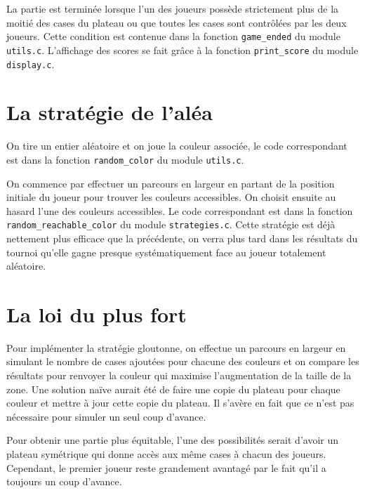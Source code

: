 \documentclass[12pt,L,fira-sans]{paper}
\begin{document}
\begin{qu}
    La partie est terminée lorsque l'un des joueurs possède strictement plus de la moitié des cases du plateau ou que toutes les cases sont contrôlées par les deux joueurs.
    Cette condition est contenue dans la fonction \verb|game_ended| du module \verb|utils.c|. L'affichage des scores se fait grâce à la fonction \verb|print_score| du module \verb|display.c|.
\end{qu}

\section{La stratégie de l'aléa}

\begin{qu}
    On tire un entier aléatoire et on joue la couleur associée, le code correspondant est dans la fonction \verb|random_color| du module \verb|utils.c|.
\end{qu}

\begin{qu}
    On commence par effectuer un parcours en largeur en partant de la position initiale du joueur pour trouver les couleurs accessibles. On choisit ensuite au hasard l'une des couleurs accessibles. Le code correspondant est dans la fonction \verb|random_reachable_color| du module \verb|strategies.c|.
    Cette stratégie est déjà nettement plus efficace que la précédente, on verra plus tard dans les résultats du tournoi qu'elle gagne presque systématiquement face au joueur totalement aléatoire.
\end{qu}

\section{La loi du plus fort}

\begin{qu}
    Pour implémenter la stratégie gloutonne, on effectue un parcours en largeur en simulant le nombre de cases ajoutées pour chacune des couleurs et on compare les résultats pour renvoyer la couleur qui maximise l'augmentation de la taille de la zone.
    Une solution naïve aurait été de faire une copie du plateau pour chaque couleur et mettre à jour cette copie du plateau. Il s'avère en fait que ce n'est pas nécessaire pour simuler un seul coup d'avance.
\end{qu}

\begin{qu}
    Pour obtenir une partie plus équitable, l'une des possibilités serait d'avoir un plateau symétrique qui donne accès aux même cases à chacun des joueurs. Cependant, le premier joueur reste grandement avantagé par le fait qu'il a toujours un coup d'avance.
\end{qu}
\end{document}
